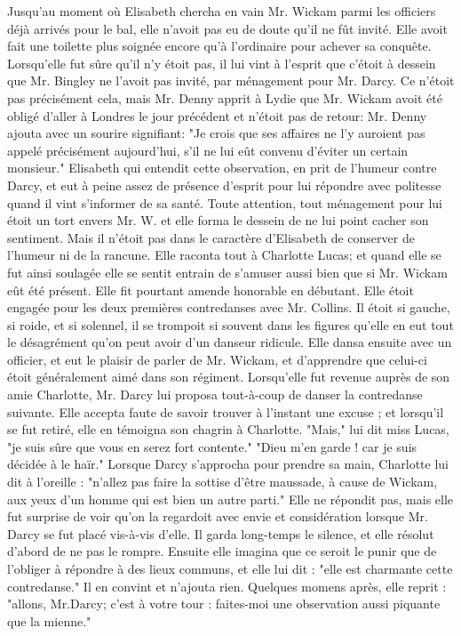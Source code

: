 Jusqu'au moment où Elisabeth chercha en vain Mr. Wickam parmi les officiers déjà arrivés pour le bal, elle n'avoit pas eu de doute qu'il ne fût invité. Elle avoit fait une toilette plus soignée encore qu'à l'ordinaire pour achever sa conquête. Lorsqu'elle fut\setcounter{page}{402} sûre qu'il n'y étoit pas, il lui vint à l'esprit que c'étoit à dessein que Mr. Bingley ne l'avoit pas invité, par ménagement pour Mr. Darcy. Ce n'étoit pas précisément cela, mais Mr. Denny apprit à Lydie que Mr. Wickam avoit été obligé d'aller à Londres le jour précédent et n'étoit pas de retour: Mr. Denny ajouta avec un sourire signifiant: "Je crois que ses affaires ne l'y auroient pas appelé précisément aujourd'hui, s'il ne lui eût convenu d'éviter un certain monsieur." Elisabeth qui entendit cette observation, en prit de l'humeur contre Darcy, et eut à peine assez de présence d'esprit pour lui répondre avec politesse quand il vint s'informer de sa santé. Toute attention, tout ménagement pour lui étoit un tort envers Mr. W. et elle forma le dessein de ne lui point cacher son sentiment. Mais il n'étoit pas dans le caractère d'Elisabeth de conserver de l'humeur ni de la rancune. Elle raconta tout à Charlotte Lucas; et quand elle se fut ainsi soulagée elle se sentit entrain de s'amuser aussi bien que si Mr. Wickam eût été présent. Elle fit pourtant amende honorable en débutant. Elle étoit engagée pour les deux premières contredanses avec Mr. Collins. Il étoit si gauche, si roide, et si\setcounter{page}{403} solennel, il se trompoit si souvent dans les figures qu'elle en eut tout le désagrément qu'on peut avoir d'un danseur ridicule. Elle dansa ensuite avec un officier, et eut le plaisir de parler de Mr. Wickam, et d'apprendre que celui-ci étoit généralement aimé dans son régiment. Lorsqu'elle fut revenue auprès de son amie Charlotte, Mr. Darcy lui proposa tout-à-coup de danser la contredanse suivante. Elle accepta faute de savoir trouver à l'instant une excuse ; et lorsqu'il se fut retiré, elle en témoigna son chagrin à Charlotte.
"Mais," lui dit miss Lucas, "je suis sûre que vous en serez fort contente."
"Dieu m'en garde ! car je suis décidée à le haïr."
Lorsque Darcy s'approcha pour prendre sa main, Charlotte lui dit à l'oreille : "n'allez pas faire la sottise d'être maussade, à cause de Wickam, aux yeux d'un homme qui est bien un autre parti."
Elle ne répondit pas, mais elle fut surprise de voir qu'on la regardoit avec envie et considération lorsque Mr. Darcy se fut placé vis-à-vis d'elle. Il garda long-temps le silence, et elle résolut d'abord de ne pas le rompre. Ensuite elle imagina que ce seroit\setcounter{page}{404} le punir que de l'obliger à répondre à des lieux communs, et elle lui dit : "elle est charmante cette contredanse." Il en convint et n'ajouta rien. Quelques momens après, elle reprit : "allons, Mr.Darcy; c'est à votre tour : faites-moi une observation aussi piquante que la mienne."
